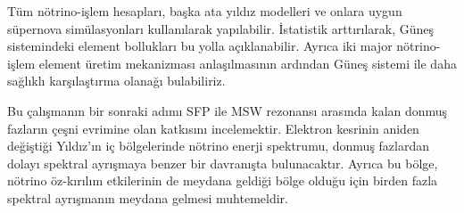 Tüm nötrino-işlem hesapları, başka ata yıldız modelleri ve onlara uygun süpernova simülasyonları kullanılarak yapılabilir. İstatistik arttırılarak, Güneş sistemindeki element bollukları bu yolla açıklanabilir. Ayrıca iki major nötrino-işlem element üretim mekanizması anlaşılmasının ardından Güneş sistemi ile daha sağlıklı karşılaştırma olanağı bulabiliriz. 

Bu çalışmanın bir sonraki adımı SFP ile MSW rezonansı arasında kalan donmuş fazların çeşni evrimine olan katkısını incelemektir. Elektron kesrinin aniden değiştiği Yıldız'ın iç bölgelerinde nötrino enerji spektrumu, donmuş fazlardan dolayı spektral ayrışmaya benzer bir davranışta bulunacaktır. Ayrıca bu bölge, nötrino öz-kırılım etkilerinin de meydana geldiği bölge olduğu için birden fazla spektral ayrışmanın meydana gelmesi muhtemeldir.